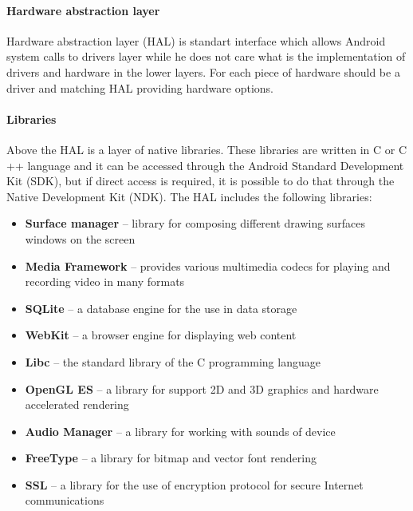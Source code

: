 \paragraph{Hardware abstraction layer}
Hardware abstraction layer (HAL) is standart interface which allows Android system calls to drivers layer while he does not care what is the implementation of drivers and hardware in the lower layers. For each piece of hardware should be a driver and matching HAL providing hardware options.

\paragraph{Libraries}
Above the HAL is a layer of native libraries. These libraries are written in C or C ++ language and it can be accessed through the Android Standard Development Kit (SDK), but if direct access is required, it is possible to do that through the Native Development Kit (NDK). The HAL includes the following libraries:

\begin{itemize}
\item \textbf{Surface manager} -- library for composing different drawing surfaces windows on the screen
\item \textbf{Media Framework} -- provides various multimedia codecs for playing and recording video in many formats
\item \textbf{SQLite} -- a database engine for the use in data storage
\item \textbf{WebKit} -- a browser engine for displaying web content
\item \textbf{Libc} -- the standard library of the C programming language
\item \textbf{OpenGL ES} -- a library for support 2D and 3D graphics and hardware accelerated rendering
\item \textbf{Audio Manager} -- a library for working with sounds of device
\item \textbf{FreeType} -- a library for bitmap and vector font rendering
\item \textbf{SSL} -- a library for the use of encryption protocol for secure Internet communications
\end{itemize}

